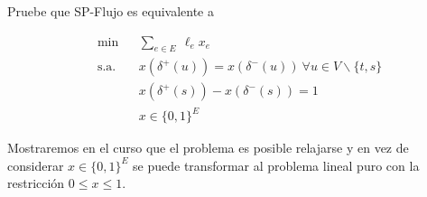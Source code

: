\begin{eje}
\begin{enumerate}[\bf I.-]
\begin{ejer}Pruebe que SP-Flujo es equivalente a

\begin{equation*}
\begin{aligned}
& \min
& & \displaystyle{\sum_{e \in E}}~\ell_{e}x_{e}\\
& \text{s.a.}
& & x(\delta^{+}(u))=x(\delta^{-}(u))~ \forall u \in V \backslash\{t,s\} \\
&&& x(\delta^{+}(s))-x(\delta^{-}(s))=1\\
&&& x \in\{0,1\}^{E}
\end{aligned}
\end{equation*}


\end{ejer}
    
\end{enumerate}

Mostraremos en el curso que el problema es posible relajarse y en vez de considerar $x\in \{0,1\}^{E}$ se puede transformar al problema lineal puro con la restricción  $0 \leq x \leq 1$.




\end{eje}




